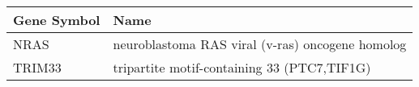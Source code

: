 \begin{tabular}{ll}
\toprule
Gene Symbol &                                             Name \\
\midrule
       NRAS & neuroblastoma RAS viral (v-ras) oncogene homolog \\
     TRIM33 &      tripartite motif-containing 33 (PTC7,TIF1G) \\
\bottomrule
\end{tabular}

